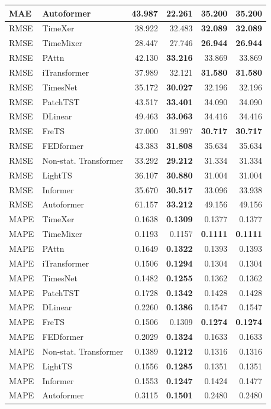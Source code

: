 \begin{longtable}{llrrrr}
MAE & Autoformer & 43.987 & \textbf{22.261} & 35.200 & 35.200 \\
\midrule
RMSE & TimeXer & 38.922 & 32.483 & \textbf{32.089} & \textbf{32.089} \\
RMSE & TimeMixer & 28.447 & 27.746 & \textbf{26.944} & \textbf{26.944} \\
RMSE & PAttn & 42.130 & \textbf{33.216} & 33.869 & 33.869 \\
RMSE & iTransformer & 37.989 & 32.121 & \textbf{31.580} & \textbf{31.580} \\
RMSE & TimesNet & 35.172 & \textbf{30.027} & 32.196 & 32.196 \\
RMSE & PatchTST & 43.517 & \textbf{33.401} & 34.090 & 34.090 \\
RMSE & DLinear & 49.463 & \textbf{33.063} & 34.416 & 34.416 \\
RMSE & FreTS & 37.000 & 31.997 & \textbf{30.717} & \textbf{30.717} \\
RMSE & FEDformer & 43.383 & \textbf{31.808} & 35.634 & 35.634 \\
RMSE & Non-stat. Transformer & 33.292 & \textbf{29.212} & 31.334 & 31.334 \\
RMSE & LightTS & 36.107 & \textbf{30.880} & 31.004 & 31.004 \\
RMSE & Informer & 35.670 & \textbf{30.517} & 33.096 & 33.938 \\
RMSE & Autoformer & 61.157 & \textbf{33.212} & 49.156 & 49.156 \\
\midrule
MAPE & TimeXer & 0.1638 & \textbf{0.1309} & 0.1377 & 0.1377 \\
MAPE & TimeMixer & 0.1193 & 0.1157 & \textbf{0.1111} & \textbf{0.1111} \\
MAPE & PAttn & 0.1649 & \textbf{0.1322} & 0.1393 & 0.1393 \\
MAPE & iTransformer & 0.1506 & \textbf{0.1294} & 0.1304 & 0.1304 \\
MAPE & TimesNet & 0.1482 & \textbf{0.1255} & 0.1362 & 0.1362 \\
MAPE & PatchTST & 0.1728 & \textbf{0.1342} & 0.1428 & 0.1428 \\
MAPE & DLinear & 0.2260 & \textbf{0.1386} & 0.1547 & 0.1547 \\
MAPE & FreTS & 0.1506 & 0.1309 & \textbf{0.1274} & \textbf{0.1274} \\
MAPE & FEDformer & 0.2029 & \textbf{0.1324} & 0.1633 & 0.1633 \\
MAPE & Non-stat. Transformer & 0.1389 & \textbf{0.1212} & 0.1316 & 0.1316 \\
MAPE & LightTS & 0.1556 & \textbf{0.1285} & 0.1351 & 0.1351 \\
MAPE & Informer & 0.1553 & \textbf{0.1247} & 0.1424 & 0.1477 \\
MAPE & Autoformer & 0.3115 & \textbf{0.1501} & 0.2480 & 0.2480 \\
\end{longtable}
\endgroup


